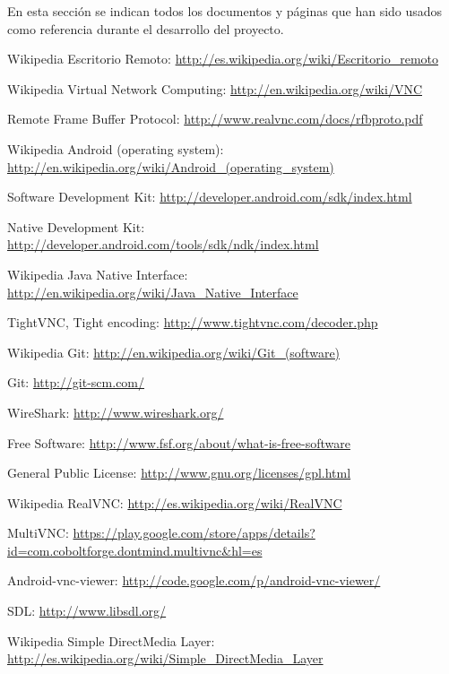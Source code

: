 En esta sección se indican todos los documentos y páginas que han sido usados como referencia durante el desarrollo del proyecto.

\begin{thebibliography}{11}

Wikipedia Escritorio Remoto: \url{http://es.wikipedia.org/wiki/Escritorio_remoto}

Wikipedia Virtual Network Computing: \url{http://en.wikipedia.org/wiki/VNC}

Remote Frame Buffer Protocol: \url{http://www.realvnc.com/docs/rfbproto.pdf}

Wikipedia Android (operating system): \url{http://en.wikipedia.org/wiki/Android_(operating_system)}

Software Development Kit:  \url{http://developer.android.com/sdk/index.html}

Native Development Kit: \url{http://developer.android.com/tools/sdk/ndk/index.html}

Wikipedia Java Native Interface: \url{http://en.wikipedia.org/wiki/Java_Native_Interface}

TightVNC, Tight encoding: \url{http://www.tightvnc.com/decoder.php}

Wikipedia Git: \url{http://en.wikipedia.org/wiki/Git_(software)}

Git: \url{http://git-scm.com/}

WireShark: \url{http://www.wireshark.org/}

Free Software: \url{http://www.fsf.org/about/what-is-free-software}

General Public License: \url{http://www.gnu.org/licenses/gpl.html}

Wikipedia RealVNC: \url{http://es.wikipedia.org/wiki/RealVNC}

MultiVNC: \url{https://play.google.com/store/apps/details?id=com.coboltforge.dontmind.multivnc&hl=es}

Android-vnc-viewer: \url{http://code.google.com/p/android-vnc-viewer/}

SDL: \url{http://www.libsdl.org/}

Wikipedia Simple DirectMedia Layer: \url{http://es.wikipedia.org/wiki/Simple_DirectMedia_Layer}


\end{thebibliography}
